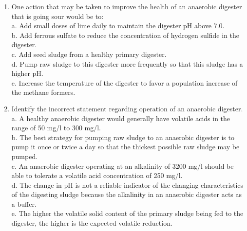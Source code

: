 \begin{tcolorbox}[breakable, enhanced,
colframe=blue!25,
colback=blue!10,
coltitle=blue!20!black,  
title= Chapter Assessment]
\begin{enumerate}
a. An anaerobic digester with pH of 7.05, an alkalinity of 2,900 mg/l and a volatile acid concentration of 250 mg/l is probably operating normally. \\
b. Sodium bicarbonate may be used in place of lime to neutralize a sour anaerobic digester. \\
c. When adding lime to a sour anaerobic digester, it is important to add an excess of this chemical to act as a reservoir of alkalinity. \\
d. Ferrous sulfate may be added to an anaerobic digester to reduce hydrogen sulfide concentration where air quality is of concern. \\
e. Gas production from anaerobic digester may be expressed as cubic feet of gas produced per pound of volatile matter added per day. \\

\item  One action that may be taken to improve the health of an anaerobic digester that is going sour would be to: \\

a. Add small doses of lime daily to maintain the digester pH above 7.0. \\
b. Add ferrous sulfate to reduce the concentration of hydrogen sulfide in the digester. \\
c. Add seed sludge from a healthy primary digester. \\
d. Pump raw sludge to this digester more frequently so that this sludge has a higher pH. \\
e. Increase the temperature of the digester to favor a population increase of the methane formers. \\

\item  Identify the incorrect statement regarding operation of an anaerobic digester. \\

a. A healthy anaerobic digester would generally have volatile acids in the range of 50 mg/l to 300 mg/l. \\
b. The best strategy for pumping raw sludge to an anaerobic digester is to pump it once or twice a day so that the thickest possible raw sludge may be pumped. \\
c. An anaerobic digester operating at an alkalinity of 3200 mg/l should be able to tolerate a volatile acid concentration of 250 mg/l. \\
d. The change in pH is not a reliable indicator of the changing characteristics of the digesting sludge because the alkalinity in an anaerobic digester acts as a buffer. \\
e. The higher the volatile solid content of the primary sludge being fed to the digester, the higher is the expected volatile reduction. \\


\end{enumerate}
\end{tcolorbox}
